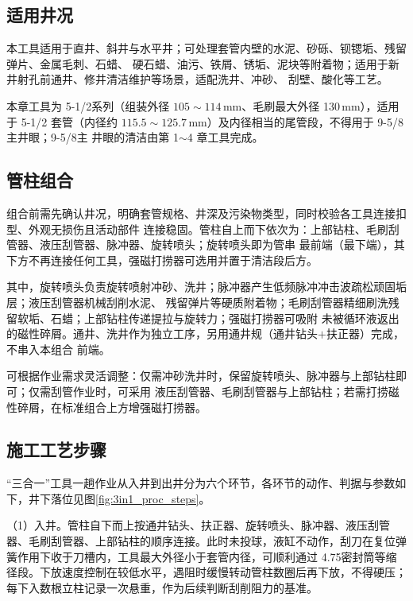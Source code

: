 \subsection{适用井况}

本工具适用于直井、斜井与水平井；可处理套管内壁的水泥、砂砾、钡锶垢、残留弹片、金属毛刺、石蜡、
硬石蜡、油污、铁屑、锈垢、泥块等附着物；适用于新井射孔前通井、修井清洁维护等场景，适配洗井、冲砂、
刮壁、酸化等工艺。

本章工具为 5-1/2\inch 系列（组装外径 $105\sim114$\,mm、毛刷最大外径 130\,mm），适用于 5-1/2\inch
套管（内径约 $115.5\sim125.7$\,mm）及内径相当的尾管段，不得用于 9-5/8\inch 主井眼；9-5/8\inch 主
井眼的清洁由第 1$\sim$4 章工具完成。

\subsection{管柱组合}

组合前需先确认井况，明确套管规格、井深及污染物类型，同时校验各工具连接扣型、外观无损伤且活动部件
连接稳固。管柱自上而下依次为：上部钻柱、毛刷刮管器、液压刮管器、脉冲器、旋转喷头；旋转喷头即为管串
最前端（最下端），其下方不再连接任何工具，强磁打捞器可选用并置于清洁段后方。

其中，旋转喷头负责旋转喷射冲砂、洗井；脉冲器产生低频脉冲冲击波疏松顽固垢层；液压刮管器机械刮削水泥、
残留弹片等硬质附着物；毛刷刮管器精细刷洗残留软垢、石蜡；上部钻柱传递提拉与旋转力；强磁打捞器可吸附
未被循环液返出的磁性碎屑。通井、洗井作为独立工序，另用通井规（通井钻头$+$扶正器）完成，不串入本组合
前端。

可根据作业需求灵活调整：仅需冲砂洗井时，保留旋转喷头、脉冲器与上部钻柱即可；仅需刮管作业时，可采用
液压刮管器、毛刷刮管器与上部钻柱；若需打捞磁性碎屑，在标准组合上方增强磁打捞器。

\subsection{施工工艺步骤}

“三合一”工具一趟作业从入井到出井分为六个环节，各环节的动作、判据与参数如下，井下落位见图\ref{fig:3in1_proc_steps}。

（1）入井。管柱自下而上按通井钻头、扶正器、旋转喷头、脉冲器、液压刮管器、毛刷刮管器、上部钻柱的顺序连接。此时未投球，液缸不动作，刮刀在复位弹簧作用下收于刀槽内，工具最大外径小于套管内径，可顺利通过 4.75\inch 密封筒等缩径段。下放速度控制在较低水平，遇阻时缓慢转动管柱数圈后再下放，不得硬压；每下入数根立柱记录一次悬重，作为后续判断刮削阻力的基准。


